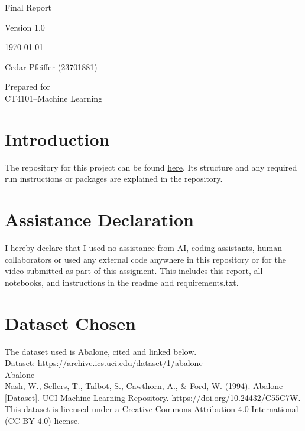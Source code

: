 \documentclass[12pt, a4paper]{article}
\begin{document}

\begin{titlepage}
    \centering
    \vspace*{4cm}
    {\Large Final Report  \par}
    \vspace{0.5cm}
    {\Large Version 1.0 \par}
    \vspace{0.5cm}
    {\Large \today \par}
    \vspace{2cm}
    {\Large Cedar Pfeiffer (23701881)\par}
    \vfill

    Prepared for\\
    CT4101--Machine Learning\par

\end{titlepage}

\newpage 

\tableofcontents

\newpage


\section{Introduction}

The repository for this project can be found \href{https://github.com/queersweetpotato/machine-learning}{here}. Its structure and any required run instructions or packages are explained in the repository.

\section{Assistance Declaration}

I hereby declare that I used no assistance from AI, coding assistants, human collaborators or used any external code anywhere in this repository or for the video submitted as part of this assigment. This includes this report, all notebooks, and instructions in the readme and requirements.txt.

\section{Dataset Chosen}
The dataset used is Abalone, cited and linked below.\\
Dataset: https://archive.ics.uci.edu/dataset/1/abalone\\
Abalone\\
Nash, W., Sellers, T., Talbot, S., Cawthorn, A., & Ford, W. (1994). Abalone [Dataset]. UCI Machine Learning Repository. https://doi.org/10.24432/C55C7W.\\
This dataset is licensed under a Creative Commons Attribution 4.0 International (CC BY 4.0) license.\\
\end{document}
